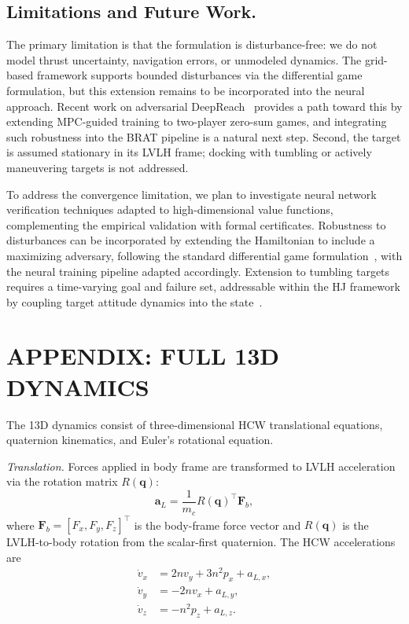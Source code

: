 \documentclass[letterpaper, 10 pt, conference]{ieeeconf}
\begin{document}
\subsection{Limitations and Future Work.}
The primary limitation is that the formulation is disturbance-free: we do not model thrust uncertainty, navigation errors, or unmodeled dynamics. The grid-based framework supports bounded disturbances via the differential game
formulation, but this extension remains to be incorporated into the neural approach. Recent work on adversarial DeepReach~\cite{teoh2025} provides a path toward this by extending MPC-guided training to two-player zero-sum games, and integrating such robustness into the BRAT pipeline is a natural next step. Second, the target is assumed stationary in its LVLH frame; docking with tumbling or actively maneuvering targets is not addressed.

To address the convergence limitation, we plan to investigate neural network verification techniques adapted to high-dimensional value functions, complementing the empirical validation with formal certificates.
Robustness to disturbances can be incorporated by extending the Hamiltonian to include a maximizing adversary, following the standard differential game formulation~\cite{mitchell2005}, with the neural training pipeline adapted accordingly. Extension to tumbling targets requires a time-varying goal and failure set, addressable within the HJ framework by coupling target attitude dynamics into the state~\cite{zagaris2018}.

\section*{APPENDIX: FULL 13D DYNAMICS} \label{sec:appendix}

The 13D dynamics consist of three-dimensional HCW translational equations, quaternion kinematics, and Euler's rotational equation.

\textit{Translation.}
Forces applied in body frame are transformed to LVLH acceleration via the rotation matrix $R(\mathbf{q})$:
\begin{equation}\label{eq:13d_trans}
\mathbf{a}_L = \frac{1}{m_c} R(\mathbf{q})^\top \mathbf{F}_b,
\end{equation}
where $\mathbf{F}_b = [F_x, F_y, F_z]^\top$ is the body-frame force vector and $R(\mathbf{q})$ is the LVLH-to-body rotation from the scalar-first quaternion. The HCW accelerations are
\begin{align}\label{eq:hcw3d}
\dot{v}_x &= 2nv_y + 3n^2 p_x + a_{L,x}, \nonumber\\
\dot{v}_y &= -2nv_x + a_{L,y}, \\
\dot{v}_z &= -n^2 p_z + a_{L,z}. \nonumber
\end{align}
\end{document}

